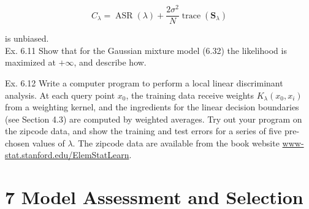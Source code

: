 \documentclass[10pt]{article}
\begin{document}
\begin{equation*}
C_{\lambda}=\operatorname{ASR}(\lambda)+\frac{2 \sigma^{2}}{N} \operatorname{trace}\left(\mathbf{S}_{\lambda}\right) \tag{6.35}
\end{equation*}


is unbiased.\\
Ex. 6.11 Show that for the Gaussian mixture model (6.32) the likelihood is maximized at $+\infty$, and describe how.

Ex. 6.12 Write a computer program to perform a local linear discriminant analysis. At each query point $x_{0}$, the training data receive weights $K_{\lambda}\left(x_{0}, x_{i}\right)$ from a weighting kernel, and the ingredients for the linear decision boundaries (see Section 4.3) are computed by weighted averages. Try out your program on the zipcode data, and show the training and test errors for a series of five pre-chosen values of $\lambda$. The zipcode data are available from the book website \href{http://www-stat.stanford.edu/ElemStatLearn}{www-stat.stanford.edu/ElemStatLearn}.

\section*{7 Model Assessment and Selection}
\end{document}
